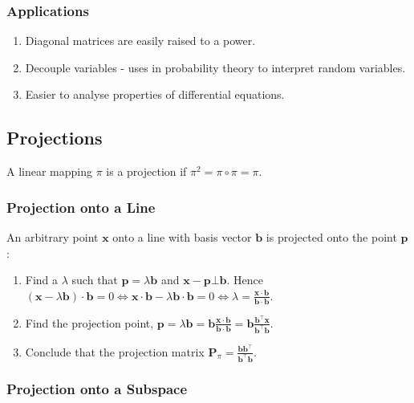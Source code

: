 \documentclass[10pt,twoside,twocolumn]{article}
\begin{document}
\subsubsection{Applications}
\begin{enumerate}
\item Diagonal matrices are easily raised to a power.
\item Decouple variables - uses in probability theory to interpret random
variables.
\item Easier to analyse properties of differential equations.
\end{enumerate}

\subsection{Projections}

A linear mapping $\pi$ is a projection if $\pi^{2}=\pi\circ\pi=\pi$.


\subsubsection{Projection onto a Line}

An arbitrary point $\mathbf{x}$ onto a line with basis vector $\mathbf{b}$
is projected onto the point $\mathbf{p}$: 
\begin{enumerate}
\item Find a $\lambda$ such that $\mathbf{p}=\lambda\mathbf{b}$ and $\mathbf{x}-\mathbf{p}\bot\mathbf{b}$.
Hence $\left(\mathbf{x}-\lambda\mathbf{b}\right)\cdot\mathbf{b}=0\iff\mathbf{x}\cdot\mathbf{b}-\lambda\mathbf{b}\cdot\mathbf{b}=0\iff\boxed{\lambda=\frac{\mathbf{x}\cdot\mathbf{b}}{\mathbf{b}\cdot\mathbf{b}}}$. 
\item Find the projection point, $\boxed{\mathbf{p}=\lambda\mathbf{b}}=\mathbf{b}\frac{\mathbf{x}\cdot\mathbf{b}}{\mathbf{b}\cdot\mathbf{b}}=\mathbf{b}\frac{\mathbf{b}^{\top}\mathbf{x}}{\mathbf{b}^{\top}\mathbf{b}}$. 
\item Conclude that the projection matrix $\boxed{\mathbf{P}_{\pi}=\frac{\mathbf{b}\mathbf{b}^{\top}}{\mathbf{b}^{\top}\mathbf{b}}}$. 
\end{enumerate}

\subsubsection{Projection onto a Subspace}
\end{document}
